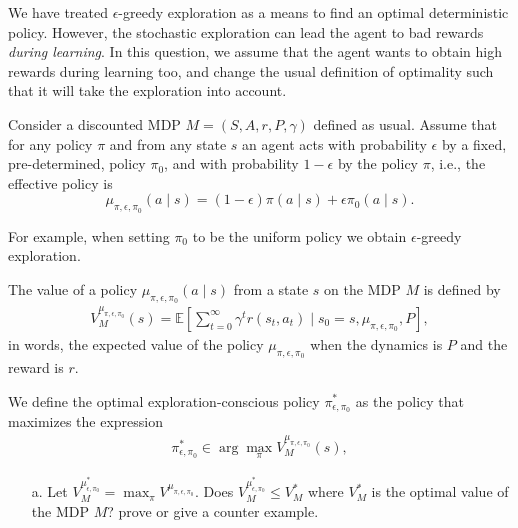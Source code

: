 We have treated $\epsilon$-greedy exploration as a means to find an optimal deterministic policy. However, the stochastic exploration can lead the agent to bad rewards \emph{during learning}. In this question, we assume that the agent wants to obtain high rewards during learning too, and change the usual definition of optimality such that it will take the exploration into account.

Consider a discounted MDP $M=(S,A,r,P,\gamma)$ defined as usual. Assume that for any policy $\pi$ and from any state $s$ an agent acts with probability $\epsilon$ by a fixed, pre-determined, policy $\pi_0$, 
and with probability $1-\epsilon$ by the policy $\pi$, i.e., the effective policy is
$$\mu_{\pi,\epsilon,\pi_0}(a\mid s) = (1-\epsilon)\pi(a\mid s) + \epsilon \pi_0 (a\mid s).$$

For example, when setting $\pi_0$ to be the uniform policy we obtain $\epsilon$-greedy exploration.

The value of a policy $\mu_{\pi,\epsilon,\pi_0}(a\mid s)$ from a state $s$ on the MDP $M$ is defined by
\begin{align*}
    V^{\mu_{\pi,\epsilon,\pi_0}}_M(s) = \mathbb{E}\left[ \sum_{t=0}^\infty \gamma^t r(s_t,a_t) \mid s_0=s,\mu_{\pi,\epsilon,\pi_0},P \right],
\end{align*}
in words, the expected value of the policy $\mu_{\pi,\epsilon,\pi_0}$ when the dynamics is $P$ and the reward is $r$. 


We define the optimal exploration-conscious policy $\pi_{\epsilon,\pi_0}^*$ as the policy that maximizes the expression 
\begin{align}
    \pi_{\epsilon,\pi_0}^*\in \arg\max_{\pi} V^{\mu_{\pi,\epsilon,\pi_0}}_M(s), \label{eq: exploration concious}
\end{align}

\begin{enumerate}
    \item[a.] Let $V^{\mu^*_{\epsilon,\pi_0}}_M = \max_{\pi} V^{\mu_{\pi,\epsilon,\pi_0}}$. Does $V^{\mu^*_{\epsilon,\pi_0}}_M\leq V^*_M$ where $V^*_M$ is the optimal value of the MDP $M$? prove or give a counter example.
\end{enumerate}

